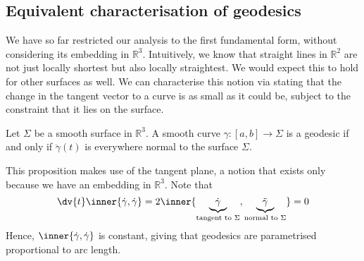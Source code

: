 \subsection{Equivalent characterisation of geodesics}
We have so far restricted our analysis to the first fundamental form, without considering its embedding in \( \mathbb R^3 \).
Intuitively, we know that straight lines in \( \mathbb R^2 \) are not just locally shortest but also locally straightest.
We would expect this to hold for other surfaces as well.
We can characterise this notion via stating that the change in the tangent vector to a curve is as small as it could be, subject to the constraint that it lies on the surface.

\begin{proposition}
	Let \( \Sigma \) be a smooth surface in \( \mathbb R^3 \).
	A smooth curve \( \gamma \colon [a,b] \to \Sigma \) is a geodesic if and only if \( \ddot \gamma(t) \) is everywhere normal to the surface \( \Sigma \).
\end{proposition}
\begin{remark}
	This proposition makes use of the tangent plane, a notion that exists only because we have an embedding in \( \mathbb R^3 \).
	Note that
	\[
		\dv{t} \inner{\dot \gamma, \dot \gamma} = 2 \inner{\underbrace{\dot \gamma}_{\text{tangent to } \Sigma}, \underbrace{\ddot \gamma}_{\text{normal to } \Sigma}} = 0
	\]
	Hence, \( \inner{\dot \gamma, \dot \gamma} \) is constant, giving that geodesics are parametrised proportional to arc length.
\end{remark}

